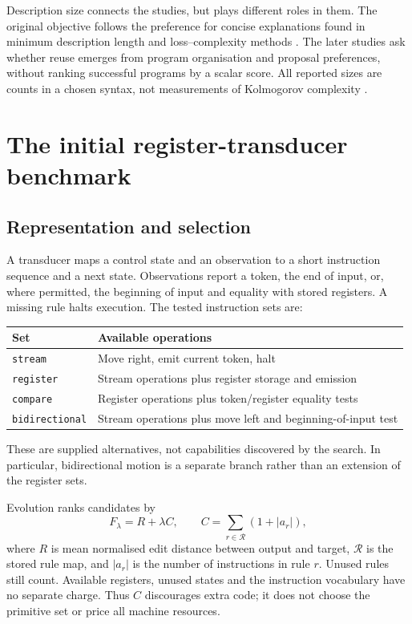 \documentclass[11pt]{article}
\begin{document}
Description size connects the studies, but plays different roles in them.
The original objective follows the preference for concise explanations found
in minimum description length and loss--complexity methods
\cite{rissanen1978,losscomplexity}. The later studies ask whether reuse emerges
from program organisation and proposal preferences, without ranking successful
programs by a scalar score. All reported sizes are counts in a chosen syntax,
not measurements of Kolmogorov complexity \cite{kolmogorov1965,live2008}.

\section{The initial register-transducer benchmark}
\label{sec:register}

\subsection{Representation and selection}

A transducer maps a control state and an observation to a short instruction
sequence and a next state. Observations report a token, the end of input, or,
where permitted, the beginning of input and equality with stored registers.
A missing rule halts execution. The tested instruction sets are:
\begin{center}
\small
\begin{tabular}{ll}
\toprule
Set & Available operations \\
\midrule
\texttt{stream} & Move right, emit current token, halt \\
\texttt{register} & Stream operations plus register storage and emission \\
\texttt{compare} & Register operations plus token/register equality tests \\
\texttt{bidirectional} & Stream operations plus move left and beginning-of-input test \\
\bottomrule
\end{tabular}
\end{center}
These are supplied alternatives, not capabilities discovered by the search.
In particular, bidirectional motion is a separate branch rather than an
extension of the register sets.

Evolution ranks candidates by
\begin{equation}
 F_\lambda = R + \lambda C,
 \qquad C=\sum_{r\in\mathcal R}(1+|a_r|),
 \label{eq:fe}
\end{equation}
where $R$ is mean normalised edit distance between output and target,
$\mathcal R$ is the stored rule map, and $|a_r|$ is the number of instructions
in rule $r$. Unused rules still count. Available registers, unused states and
the instruction vocabulary have no separate charge. Thus $C$ discourages
extra code; it does not choose the primitive set or price all machine resources.
\end{document}
